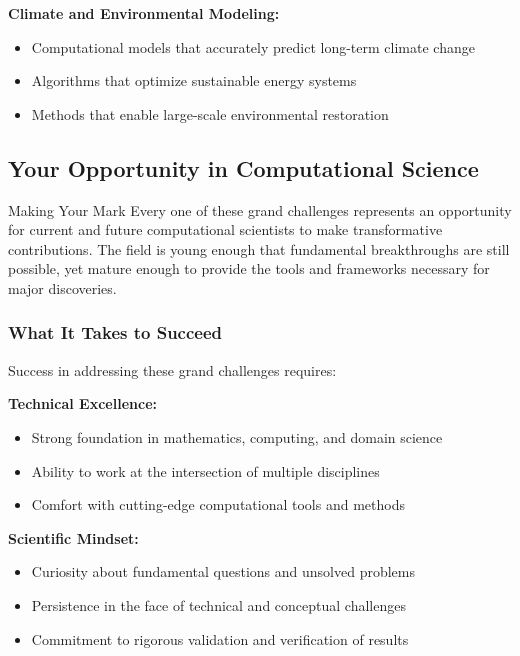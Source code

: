 \textbf{Climate and Environmental Modeling:}
\begin{itemize}
    \item Computational models that accurately predict long-term climate change
    \item Algorithms that optimize sustainable energy systems
    \item Methods that enable large-scale environmental restoration
\end{itemize}

\subsection{Your Opportunity in Computational Science}

\begin{examplebox}{Making Your Mark}
Every one of these grand challenges represents an opportunity for current and future computational scientists to make transformative contributions. The field is young enough that fundamental breakthroughs are still possible, yet mature enough to provide the tools and frameworks necessary for major discoveries.
\end{examplebox}

\subsubsection{What It Takes to Succeed}

Success in addressing these grand challenges requires:

\textbf{Technical Excellence:}
\begin{itemize}
    \item Strong foundation in mathematics, computing, and domain science
    \item Ability to work at the intersection of multiple disciplines
    \item Comfort with cutting-edge computational tools and methods
\end{itemize}

\textbf{Scientific Mindset:}
\begin{itemize}
    \item Curiosity about fundamental questions and unsolved problems
    \item Persistence in the face of technical and conceptual challenges
    \item Commitment to rigorous validation and verification of results
\end{itemize}

